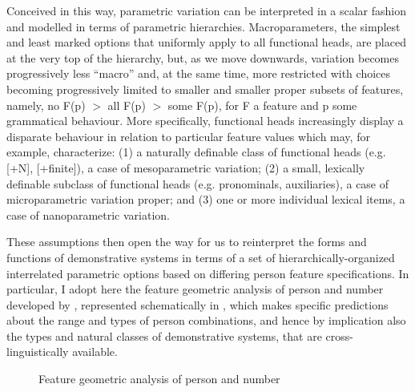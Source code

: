 \documentclass[output=paper]{langsci/langscibook}
\begin{document}
Conceived in this way, parametric variation can be interpreted in a scalar
fashion and modelled in terms of parametric hierarchies. Macroparameters, the
simplest and least marked options that uniformly apply to all functional heads,
are placed at the very top of the hierarchy, but, as we move downwards,
variation becomes progressively less \enquote{macro} and, at the same time,
more restricted with choices becoming progressively limited to smaller and
smaller proper subsets of features, namely, no F(p) $>$ all F(p) $>$ some F(p),
for F a feature and p some grammatical behaviour. More specifically, functional
heads increasingly display a disparate behaviour in relation to particular
feature values which may, for example, characterize: (1) a
naturally definable class of functional heads (e.g. [+N],
[+finite]), a case of mesoparametric variation; (2) a small,
lexically definable subclass of functional heads (e.g.
pronominals, auxiliaries), a case of microparametric variation
proper; and (3) one or more individual lexical items, a case of
nanoparametric variation.

These assumptions then open the way for us to reinterpret the forms and
functions of  demonstrative systems in terms of a set of
hierarchically-organized interrelated parametric options based on differing
person feature specifications. In particular, I adopt here the feature
geometric analysis of person and number developed by \citet{HarRit2002},
represented schematically in , which makes specific
predictions about the range and types of person combinations, and hence by
implication also the types and natural classes of demonstrative systems, that
are cross-linguistically available.

\begin{figure}
    \centering\caption{Feature geometric analysis of person and number
    \parencite{HarRit2002}}\label{fig:2}
\end{figure}
\end{document}
